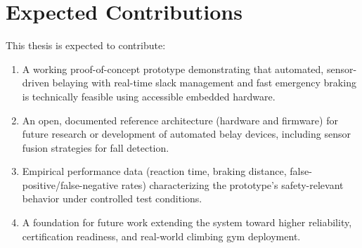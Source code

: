 \documentclass[11pt, a4paper]{article}
\begin{document}
\section{Expected Contributions}

This thesis is expected to contribute:

\begin{enumerate}[leftmargin=1.2cm]
    \item A working proof-of-concept prototype demonstrating that
        automated, sensor-driven belaying with real-time slack
        management and fast emergency braking is technically feasible
        using accessible embedded hardware.
    \item An open, documented reference architecture (hardware and
        firmware) for future research or development of automated belay
        devices, including sensor fusion strategies for fall detection.
    \item Empirical performance data (reaction time, braking distance,
        false-positive/false-negative rates) characterizing the
        prototype's safety-relevant behavior under controlled test
        conditions.
    \item A foundation for future work extending the system toward
        higher reliability, certification readiness, and real-world
        climbing gym deployment.
\end{enumerate}
\end{document}
